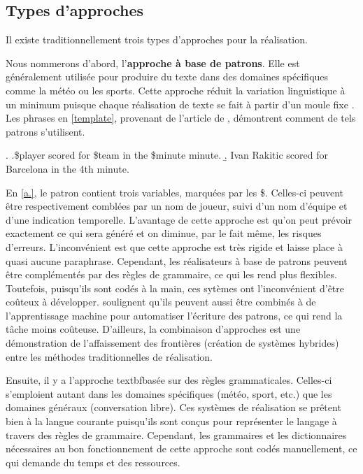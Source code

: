 \subsection{Types d'approches}

Il existe traditionnellement trois types d'approches pour la réalisation.

Nous nommerons d'abord, l'\textbf{approche à base de patrons}. Elle est généralement utilisée pour produire du texte dans des domaines spécifiques comme la météo ou les sports. Cette approche réduit la variation linguistique à un minimum puisque chaque réalisation de texte se fait à partir d'un moule fixe \citep{mcroy_channarukul_ali_2003}. Les phrases en \ref{template}, provenant de l'article de \cite{gatt18}, démontrent comment de tels patrons s'utilisent.

\ex. \label{template}
	\a.\$player scored for \$team in the \$minute minute. \label{a.}
	\b. Ivan Rakitic scored for Barcelona in the 4th minute.

En \ref{a.}, le patron contient trois variables, marquées par les \$. Celles-ci peuvent être respectivement comblées par un nom de joueur, suivi d'un nom d'équipe et d'une indication temporelle. L'avantage de cette approche est qu'on peut prévoir exactement ce qui sera généré et on diminue, par le fait même, les risques d'erreurs. L'inconvénient est que cette approche est très rigide et laisse place à quasi aucune paraphrase. Cependant, les réalisateurs à base de patrons peuvent être complémentés par des règles de grammaire, ce qui les rend plus flexibles. Toutefois, puisqu'ils sont codés à la main, ces sytèmes ont l'inconvénient d'être coûteux à développer. \cite{gatt18} soulignent qu'ils peuvent aussi être combinés à de l'apprentissage machine pour automatiser l'écriture des patrons, ce qui rend la tâche moins coûteuse. D'ailleurs, la combinaison d'approches est une démonstration de l'affaissement des frontières (création de systèmes hybrides) entre les méthodes traditionnelles de réalisation.


Ensuite, il y a l'approche textbf{basée sur des règles grammaticales}. Celles-ci s'emploient autant dans les domaines spécifiques (météo, sport, etc.) que les domaines généraux (conversation libre). Ces systèmes de réalisation se prêtent bien à la langue courante puisqu'ils sont conçus pour représenter le langage à travers des règles de grammaire. Cependant, les grammaires et les dictionnaires nécessaires au bon fonctionnement de cette approche sont codés manuellement, ce qui demande du temps et des ressources.


